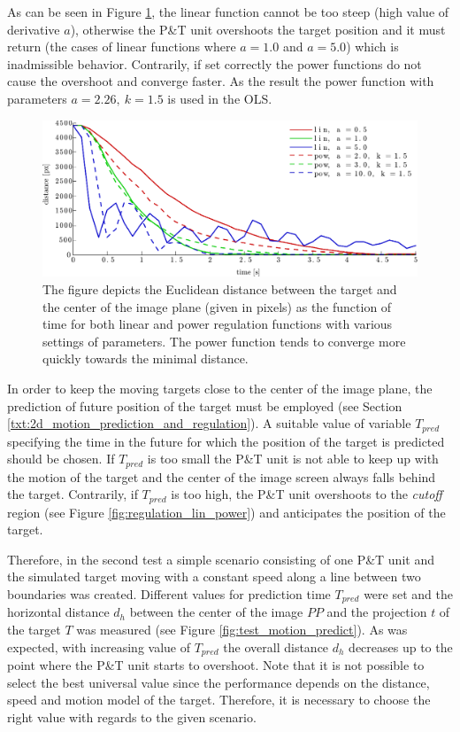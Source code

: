 As can be seen in Figure \ref{fig:test_reg_lin_pow}, the linear function cannot be too steep (high value of derivative $a$), otherwise the P\&T unit overshoots the target position and it must return (the cases of linear functions where $a = 1.0$ and $a = 5.0$) which is inadmissible behavior. Contrarily, if set correctly the power functions do not cause the overshoot and converge faster. As the result the power function with parameters $a = 2.26,~k = 1.5$ is used in the OLS.

\begin{figure}[htb]\centering
	\centering
	\includegraphics[width=0.75\linewidth]{fig/test_regulation_lin_pow.pdf}
	\caption{The figure depicts the Euclidean distance between the target and the center of the image plane (given in pixels) as the function of time for both linear and power regulation functions with various settings of parameters. The power function tends to converge more quickly towards the minimal distance.}
	\label{fig:test_reg_lin_pow}
\end{figure}

In order to keep the moving targets close to the center of the image plane, the prediction of future position of the target must be employed (see Section \ref{txt:2d_motion_prediction_and_regulation}). A suitable value of variable $T_{pred}$ specifying the time in the future for which the position of the target is predicted should be chosen. If $T_{pred}$ is too small the P\&T unit is not able to keep up with the motion of the target and the center of the image screen always falls behind the target. Contrarily, if $T_{pred}$ is too high, the P\&T unit overshoots to the \textit{cutoff} region (see Figure \ref{fig:regulation_lin_power}) and anticipates the position of the target.

Therefore, in the second test a simple scenario consisting of one P\&T unit and the simulated target moving with a constant speed along a line between two boundaries was created. Different values for prediction time $T_{pred}$ were set and the horizontal distance $d_{h}$ between the center of the image $PP$ and the projection $t$ of the target $T$ was measured (see Figure \ref{fig:test_motion_predict}). As was expected, with increasing value of $T_{pred}$ the overall distance $d_{h}$ decreases up to the point where the P\&T unit starts to overshoot. Note that it is not possible to select the best universal value since the performance depends on the distance, speed and motion model of the target. Therefore, it is necessary to choose the right value with regards to the given scenario.

